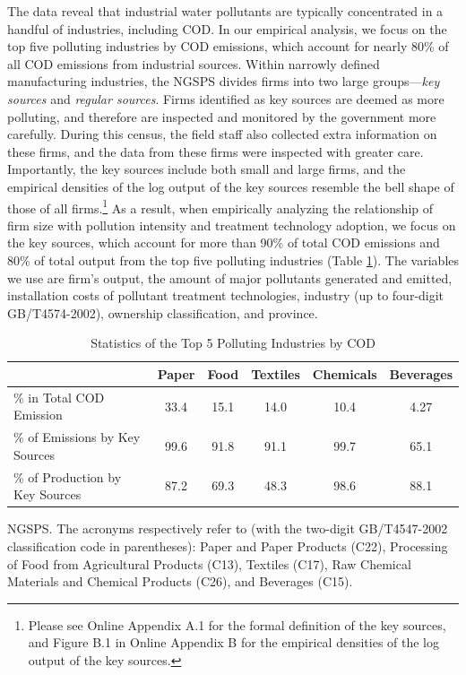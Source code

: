 \documentclass[AEJ]{AEA}
\begin{document}
The data reveal that industrial water pollutants are typically concentrated in a handful of industries, including COD. In our empirical analysis, we focus on the top five polluting industries by COD emissions, which account for nearly 80\% of all COD emissions from industrial sources. Within narrowly defined manufacturing industries, the NGSPS divides firms into two large groups---\textit{key sources} and \textit{regular sources}. Firms identified as key sources are deemed as more polluting, and therefore are inspected and monitored by the government more carefully. During this census, the field staff also collected extra information on these firms, and the data from these firms were inspected with greater care. Importantly, the key sources include both small and large firms, and the empirical densities of the log output of the key sources resemble the bell shape of those of all firms.\footnote{Please see Online Appendix A.1 for the formal definition of the key sources, and Figure B.1 in Online Appendix B for  the empirical densities of the log output of the key sources.} As a result, when empirically analyzing the relationship of firm size with pollution intensity and treatment technology adoption, we focus on the key sources, which account for more than 90\% of total COD emissions and 80\% of total output from the top five polluting industries (Table \ref{tab:top5summary}). The variables we use are firm's output, the amount of major pollutants generated and emitted, installation costs of pollutant treatment technologies, industry (up to four-digit GB/T4574-2002), ownership classification, and province.

\begin{table}[t]
\footnotesize
\centering
\caption{Statistics of the Top 5 Polluting Industries by COD}
\begin{tabular}{lccccc}
    \hline \hline
                                       & Paper & Food & Textiles  & Chemicals & Beverages  \\
    \hline
    \% in Total COD Emission           & 33.4  & 15.1 & 14.0 & 10.4 & 4.27  \\
    \% of Emissions by Key Sources     & 99.6  & 91.8 & 91.1 & 99.7 & 65.1  \\
    \% of Production by Key Sources    & 87.2  & 69.3 & 48.3 & 98.6 & 88.1  \\
    \hline
\end{tabular}
\begin{tablenotes}[Sources]
     NGSPS. The acronyms respectively refer to (with the two-digit GB/T4547-2002 classification code in parentheses): Paper and Paper Products (C22), Processing of Food from Agricultural Products (C13), Textiles (C17), Raw Chemical Materials and Chemical Products (C26), and Beverages (C15).
\end{tablenotes}
\label{tab:top5summary}
\end{table}
\end{document}
